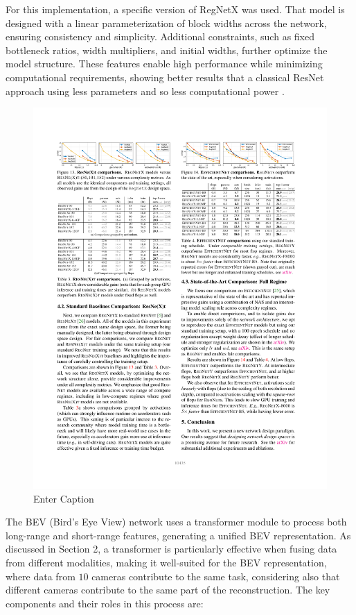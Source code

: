 For this implementation, a specific version of RegNetX was used. That model is designed with a linear parameterization of block widths across the network, ensuring consistency and simplicity. Additional constraints, such as fixed bottleneck ratios, width multipliers, and initial widths, further optimize the model structure. These features enable high performance while minimizing computational requirements, showing better results that a classical ResNet approach using less parameters and so less computational power \cite{Radosavovic2020}.
\begin{figure}[H]
    \centering
    \includegraphics[width=1\linewidth]{Radosavovic_Designing_Network_Design_Spaces_CVPR_2020_paper (2).pdf}
    \caption{Enter Caption \cite{Radosavovic2020}}
    \label{fig:regnetvsresnet}
\end{figure}

The BEV (Bird’s Eye View) network uses a transformer module to process both long-range and short-range features, generating a unified BEV representation. As discussed in Section 2, a transformer is particularly effective when fusing data from different modalities, making it well-suited for the BEV representation, where data from $10$ cameras contribute to the same task, considering also that different cameras contribute to the same part of the reconstruction. 
The key components and their roles in this process are:

